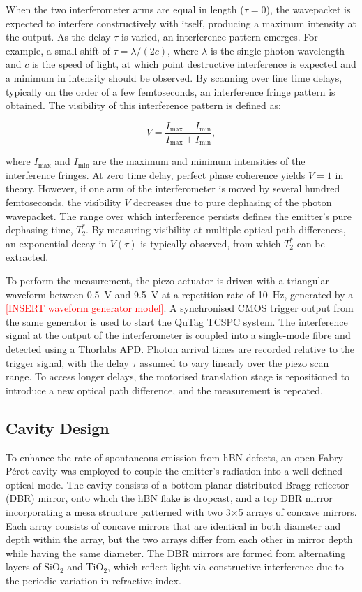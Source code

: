 When the two interferometer arms are equal in length ($\tau = 0$), the wavepacket is expected to interfere constructively with itself, producing a maximum intensity at the output. As the delay $\tau$ is varied, an interference pattern emerges. For example, a small shift of $\tau = \lambda / (2c)$, where $\lambda$ is the single-photon wavelength and $c$ is the speed of light, at which point destructive interference is expected and a minimum in intensity should be observed. By scanning over fine time delays, typically on the order of a few femtoseconds, an interference fringe pattern is obtained. The visibility of this interference pattern is defined as:

\begin{equation}
    V = \frac{I_\text{max} - I_\text{min}}{I_\text{max} + I_\text{min}},
\end{equation}

where $I_\text{max}$ and $I_\text{min}$ are the maximum and minimum intensities of the interference fringes. At zero time delay, perfect phase coherence yields $V = 1$ in theory. However, if one arm of the interferometer is moved by several hundred femtoseconds, the visibility $V$ decreases due to pure dephasing of the photon wavepacket. The range over which interference persists defines the emitter's pure dephasing time, $T_2^*$. By measuring visibility at multiple optical path differences, an exponential decay in $V(\tau)$ is typically observed, from which $T_2^*$ can be extracted.

To perform the measurement, the piezo actuator is driven with a triangular waveform between 0.5~V and 9.5~V at a repetition rate of 10~Hz, generated by a \textcolor{red}{[INSERT waveform generator model]}. A synchronised CMOS trigger output from the same generator is used to start the QuTag TCSPC system. The interference signal at the output of the interferometer is coupled into a single-mode fibre and detected using a Thorlabs APD. Photon arrival times are recorded relative to the trigger signal, with the delay $\tau$ assumed to vary linearly over the piezo scan range. To access longer delays, the motorised translation stage is repositioned to introduce a new optical path difference, and the measurement is repeated.


\subsection{Cavity Design}

To enhance the rate of spontaneous emission from hBN defects, an open Fabry–Pérot cavity was employed to couple the emitter’s radiation into a well-defined optical mode. The cavity consists of a bottom planar distributed Bragg reflector (DBR) mirror, onto which the hBN flake is dropcast, and a top DBR mirror incorporating a mesa structure patterned with two 3$\times$5 arrays of concave mirrors. Each array consists of concave mirrors that are identical in both diameter and depth within the array, but the two arrays differ from each other in mirror depth while having the same diameter. The DBR mirrors are formed from alternating layers of SiO$_2$ and TiO$_2$, which reflect light via constructive interference due to the periodic variation in refractive index.

